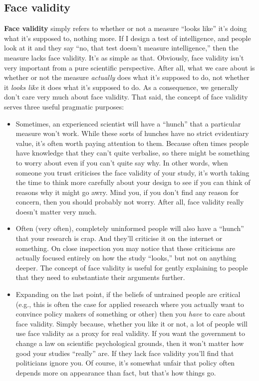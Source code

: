 \documentclass[
]{book}
\providecommand{\tightlist}{%
  \setlength{\itemsep}{0pt}\setlength{\parskip}{0pt}}
\begin{document}
\hypertarget{face-validity}{%
\subsection{Face validity}\label{face-validity}}

{\textbf{Face validity}} simply refers to whether or not a measure ``looks like'' it's doing what it's supposed to, nothing more. If I design a test of intelligence, and people look at it and they say ``no, that test doesn't measure intelligence,'' then the measure lacks face validity. It's as simple as that. Obviously, face validity isn't very important from a pure scientific perspective. After all, what we care about is whether or not the measure \emph{actually} does what it's supposed to do, not whether it \emph{looks like} it does what it's supposed to do. As a consequence, we generally don't care very much about face validity. That said, the concept of face validity serves three useful pragmatic purposes:

\begin{itemize}
\tightlist
\item
  Sometimes, an experienced scientist will have a ``hunch'' that a particular measure won't work. While these sorts of hunches have no strict evidentiary value, it's often worth paying attention to them. Because often times people have knowledge that they can't quite verbalise, so there might be something to worry about even if you can't quite say why. In other words, when someone you trust criticises the face validity of your study, it's worth taking the time to think more carefully about your design to see if you can think of reasons why it might go awry. Mind you, if you don't find any reason for concern, then you should probably not worry. After all, face validity really doesn't matter very much.
\item
  Often (very often), completely uninformed people will also have a ``hunch'' that your research is crap. And they'll criticise it on the internet or something. On close inspection you may notice that these criticisms are actually focused entirely on how the study ``looks,'' but not on anything deeper. The concept of face validity is useful for gently explaining to people that they need to substantiate their arguments further.
\item
  Expanding on the last point, if the beliefs of untrained people are critical (e.g., this is often the case for applied research where you actually want to convince policy makers of something or other) then you \emph{have} to care about face validity. Simply because, whether you like it or not, a lot of people will use face validity as a proxy for real validity. If you want the government to change a law on scientific psychological grounds, then it won't matter how good your studies ``really'' are. If they lack face validity you'll find that politicians ignore you. Of course, it's somewhat unfair that policy often depends more on appearance than fact, but that's how things go.
\end{itemize}
\end{document}
